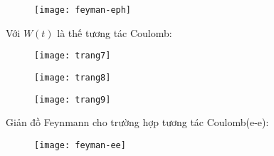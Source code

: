 \documentclass{report}
\begin{document}
\begin{figure}[h]
	\centering
	\texttt{[image: feyman-eph]}
	\label{fig:feyman-eph}
\end{figure}


\newpage

Với $W(t)$ là thế tương tác Coulomb:

\begin{figure}[h]
	\centering
	\texttt{[image: trang7]}
	\label{fig:trang7}
\end{figure}

\begin{figure}[h]
	\centering
	\texttt{[image: trang8]}
	\label{fig:trang8}
\end{figure}

\begin{figure}[h]
	\centering
	\texttt{[image: trang9]}
	\label{fig:trang9}
\end{figure}


\newpage
Giản đồ Feynmann cho trường hợp tương tác Coulomb(e-e):

\begin{figure}[h]
	\centering
	\texttt{[image: feyman-ee]}
	\label{fig:feyman-ee}
\end{figure}
\end{document}
